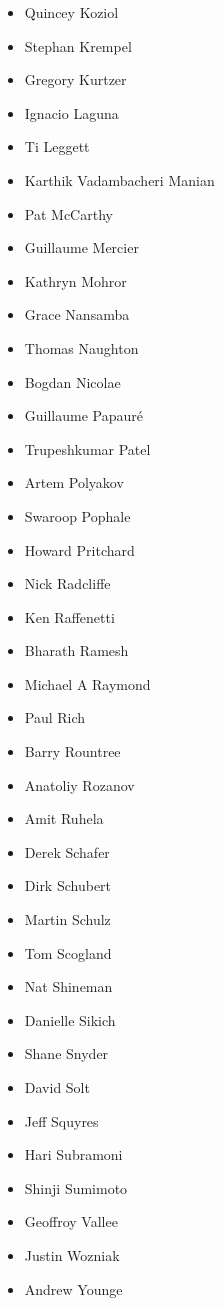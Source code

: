 \begin{itemize}
    \item Quincey Koziol
    \item Stephan Krempel
    \item Gregory Kurtzer
    \item Ignacio Laguna
    \item Ti Leggett
    \item Karthik Vadambacheri Manian
    \item Pat McCarthy
    \item Guillaume Mercier
    \item Kathryn Mohror
    \item Grace Nansamba
    \item Thomas Naughton
    \item Bogdan Nicolae
    \item Guillaume Papauré
    \item Trupeshkumar Patel
    \item Artem Polyakov
    \item Swaroop Pophale
    \item Howard Pritchard
    \item Nick Radcliffe
    \item Ken Raffenetti
    \item Bharath Ramesh
    \item Michael A Raymond
    \item Paul Rich
    \item Barry Rountree
    \item Anatoliy Rozanov
    \item Amit Ruhela
    \item Derek Schafer
    \item Dirk Schubert
    \item Martin Schulz
    \item Tom Scogland
    \item Nat Shineman
    \item Danielle Sikich
    \item Shane Snyder
    \item David Solt
    \item Jeff Squyres
    \item Hari Subramoni
    \item Shinji Sumimoto
    \item Geoffroy Vallee
    \item Justin Wozniak
    \item Andrew Younge
\end{itemize}

